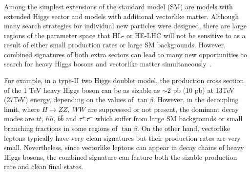 \subsubsection{}
%
%
%


Among the simplest extensions of the standard model (SM) are models with extended Higgs sector and models with additional vectorlike matter. 
Although many search strategies for individual new particles were designed, there are large regions of the parameter space that HL- or HE-LHC will not be sensitive to as a result of either small production rates or large SM backgrounds.  However, combined signatures of both extra sectors can lead to many new opportunities to search for heavy Higgs bosons and vectorlike matter simultaneously~\cite{Dermisek:2015hue}. 

For example, in a type-II two Higgs doublet model, the production cross section of the 1 TeV heavy \cpeven {}  Higgs boson can be as sizable as $\sim 2$ pb (10 pb) at 13TeV (27TeV) \com energy, depending on the values of $\tan\beta$.
However, in the decoupling limit, where $H \to ZZ,\; WW$ are suppressed or not present, the dominant decay modes are $t\bar t$, $hh$, $b\bar b$ and $\tau^+\tau^-$ which suffer from large SM backgrounds or small branching fractions in some regions of $\tan \beta$. On the other hand, vectorlike leptons typically have very clean signatures but their production rates are very small. Nevertheless, since vectorlike leptons can appear in decay chains of  heavy Higgs bosons, the combined signature can feature both the sizable production rate and clean final states. 


